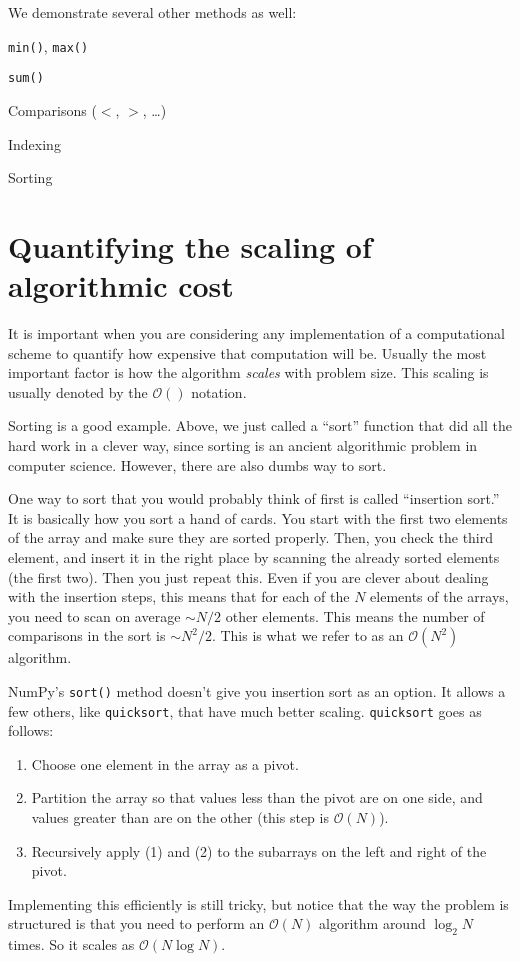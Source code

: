 We demonstrate several other methods as well:
\begin{ditemize}
\item {\tt min()}, {\tt max()}
\item {\tt sum()}
\item Comparisons ($<$, $>$, \ldots)
\item Indexing
\item Sorting
\end{ditemize}

\section{Quantifying the scaling of algorithmic cost}

It is important when you are considering any implementation of a
computational scheme to quantify how expensive that computation will
be. Usually the most important factor is how the algorithm {\it
  scales} with problem size. This scaling is usually denoted by the
$\mathcal{O}()$ notation. 

Sorting is a good example. Above, we just called a ``sort'' function
that did all the hard work in a clever way, since sorting is an
ancient algorithmic problem in computer science. However, there are 
also dumbs way to sort.

One way to sort that you would probably think of first is called
``insertion sort.'' It is basically how you sort a hand of cards. You
start with the first two elements of the array and make sure they are
sorted properly. Then, you check the third element, and insert it in
the right place by scanning the already sorted elements (the first
two). Then you just repeat this. Even if you are clever about dealing
with the insertion steps, this means that for each of the $N$ elements
of the arrays, you need to scan on average $\sim N/2$ other
elements. This means the number of comparisons in the sort is $\sim
N^2/2$. This is what we refer to as an $\mathcal{O}(N^2)$ algorithm.

NumPy's {\tt sort()} method doesn't give you insertion sort as an
option. It allows a few others, like {\tt quicksort}, that have much
better scaling. {\tt quicksort} goes as follows:
\begin{enumerate}
\item Choose one element in the array as a pivot.
\item Partition the array so that values less than the pivot are on
  one side, and values greater than are on the other (this step is
  $\mathcal{O}(N)$).
\item Recursively apply (1) and (2) to the subarrays on the left and
  right of the pivot.
\end{enumerate}
Implementing this efficiently is still tricky, but notice that the way
the problem is structured is that you need to perform an
$\mathcal{O}(N)$ algorithm around $\log_2N$ times. So it scales as
$\mathcal{O}(N\log N)$.

